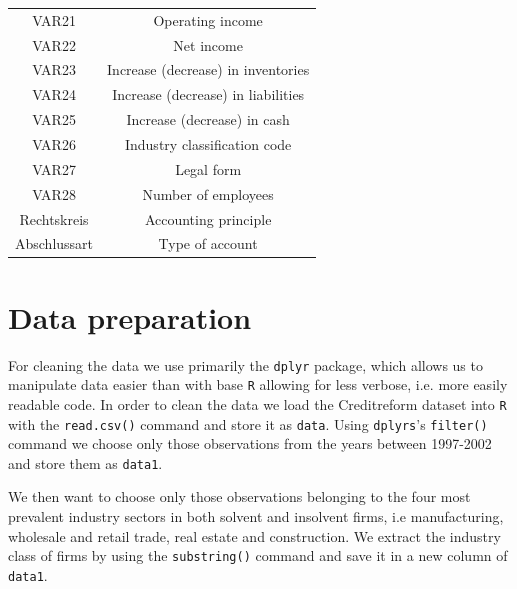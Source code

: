 \documentclass{article}
\begin{document}
\begin{center}
\begin{table}
\begin{tabular}{cc}
VAR21 & Operating income\\
VAR22 & Net income\\
VAR23 & Increase (decrease) in inventories\\
VAR24 & Increase (decrease) in liabilities\\
VAR25 & Increase (decrease) in cash\\
VAR26 & Industry classification code\\
VAR27 & Legal form\\
VAR28 & Number of employees\\
Rechtskreis & Accounting principle\\
Abschlussart & Type of account\\
\hline\hline
\end{tabular}
\end{table}
\end{center}

\section{Data preparation}

For cleaning the data we use primarily the \texttt{dplyr} package, which allows us to manipulate data easier than with base \texttt{R} allowing for less verbose, i.e. more easily readable code. In order to clean the data we load the Creditreform dataset into \texttt{R} with the \texttt{read.csv()} command and store it as \texttt{data}. Using \texttt{dplyrs}'s \texttt{filter()} command we choose only those observations from the years between 1997-2002 and store them as \texttt{data1}.



We then want to choose only those observations belonging to the four most prevalent industry sectors in both solvent and insolvent firms, i.e manufacturing, wholesale and retail trade, real estate and construction. We extract the industry class of firms by using the \texttt{substring()} command and save it in a new column of \texttt{data1}.


\end{document}
